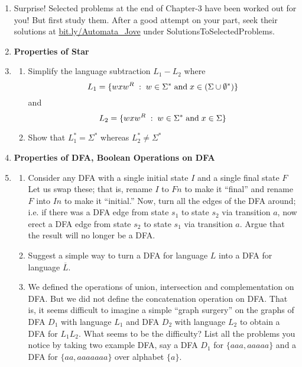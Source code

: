 \documentclass[12pt]{article}
\begin{document}
\begin{enumerate}

\item Surprise! Selected problems at the end of Chapter-3 have been worked
  out for you! But first study them. After a good attempt on your
  part, seek their solutions at
  \url{bit.ly/Automata_Jove} under SolutionsToSelectedProblems.

 
\item[] {\bf Properties of Star}
  

\item \label{qn2}
 \begin{enumerate}
 \item  \label{qn2a}
   Simplify the language subtraction
   \(  L_1 - L_2 \)
   where
   \[ L_1 = \{ wxw^R \;:\; w\in\Sigma^*\; {\rm and}\;
   x\in (\Sigma\cup \emptyset^*) \} \]
   and
   \[ L_2 = \{ wxw^R \;:\; w\in\Sigma^*\; {\rm and}\; x\in \Sigma\}\]
    

  
  \item  \label{qn2b}
    Show that $L_1^* = \Sigma^*$ whereas $L_2^* \neq \Sigma^*$
 \end{enumerate}



\item[] {\bf Properties of DFA, Boolean Operations on DFA}
 
\item  \label{qn1}
  \begin{enumerate}
  \item Consider any DFA with a single initial state $I$ and a single
    final state $F$
    Let us swap these; that is, rename $I$ to $Fn$ to make it ``final''
    and rename $F$ into $In$ to make it ``initial.''
    Now, turn all the edges of the DFA around; i.e. if there was a
    DFA edge from state $s_1$ to state $s_2$ via transition $a$,
    now erect a
    DFA edge from state $s_2$ to state $s_1$ via transition $a$.    
    Argue that the result will no longer be a DFA.

  \item Suggest a simple way to turn a DFA for language $L$
    into a DFA for language $\overline{L}$.
    
  \item We defined the operations of union, intersection and complementation
    on DFA.
    But we did not define the concatenation operation on DFA.
    That is, it seems difficult to imagine a simple ``graph surgery''
    on the graphs of DFA $D_1$ with language
    $L_1$
    and DFA $D_2$ with language $L_2$ to obtain a DFA
    for $L_1 L_2$.
    What seems to be the difficulty?
    List all the problems you notice by taking two example DFA, say
    a DFA $D_1$ for $\{aaa,aaaaa\}$ %
    and a DFA for
    $\{aa, aaaaaaa\}$ %
    over
    alphabet $\{a\}$.
  \end{enumerate}

\end{enumerate}


\end{document}
